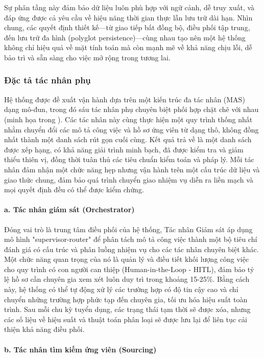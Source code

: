 \documentclass{article}
\begin{document}
\begin{itemize}[topsep=0pt, itemsep=4pt, leftmargin=40pt]
Sự phân tầng này đảm bảo dữ liệu luôn phù hợp với ngữ cảnh, dễ truy xuất, và đáp ứng được cả yêu cầu về hiệu năng thời gian thực lẫn lưu trữ dài hạn. Nhìn chung, các quyết định thiết kế—từ giao tiếp bất đồng bộ, điều phối tập trung, đến lưu trữ đa hình (polyglot persistence)—cùng nhau tạo nên một hệ thống không chỉ hiệu quả về mặt tính toán mà còn mạnh mẽ về khả năng chịu lỗi, dễ bảo trì và sẵn sàng cho việc mở rộng trong tương lai.


\subsubsection{Đặc tả tác nhân phụ}
Hệ thống được đề xuất vận hành dựa trên một kiến trúc đa tác nhân (MAS) dạng mô-đun, trong đó sáu tác nhân phụ chuyên biệt phối hợp chặt chẽ với nhau (minh họa trong \hyperref[fig:architecture-diagram]{\color{blue}{Hình 4.3}}). Các tác nhân này cùng thực hiện một quy trình thống nhất nhằm chuyển đổi các mô tả công việc và hồ sơ ứng viên từ dạng thô, không đồng nhất thành một danh sách rút gọn cuối cùng. Kết quả trả về là một danh sách được xếp hạng, có khả năng giải trình minh bạch, đã được kiểm tra và giảm thiểu thiên vị, đồng thời tuân thủ các tiêu chuẩn kiểm toán và pháp lý. Mỗi tác nhân đảm nhận một chức năng hẹp nhưng vận hành trên một cấu trúc dữ liệu và giao thức chung, đảm bảo quá trình chuyển giao nhiệm vụ diễn ra liền mạch và mọi quyết định đều có thể được kiểm chứng.

\paragraph{a. Tác nhân giám sát (Orchestrator)}

Đóng vai trò là trung tâm điều phối của hệ thống, Tác nhân Giám sát áp dụng mô hình "supervisor-router" để phân tách mô tả công việc thành một bộ tiêu chí đánh giá có cấu trúc và phân luồng nhiệm vụ cho các tác nhân chuyên biệt khác. Một chức năng quan trọng của nó là quản lý và điều tiết khối lượng công việc cho quy trình có con người can thiệp (Human-in-the-Loop - HITL), đảm bảo tỷ lệ hồ sơ cần chuyên gia xem xét luôn duy trì trong khoảng 15-25\%. Bằng cách này, hệ thống có thể tự động xử lý các trường hợp có độ tin cậy cao và chỉ chuyển những trường hợp phức tạp đến chuyên gia, tối ưu hóa hiệu suất toàn trình. Sau mỗi chu kỳ tuyển dụng, các trạng thái tạm thời sẽ được xóa, nhưng các số liệu về hiệu suất và thuật toán phân loại sẽ được lưu lại để liên tục cải thiện khả năng điều phối.

\paragraph{b. Tác nhân tìm kiếm ứng viên (Sourcing)}


\end{itemize}
\end{document}
